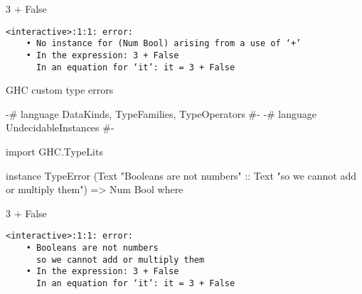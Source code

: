 





\begin{frame}[fragile]

\Large
\begin{texttt}
3 + False
\end{texttt}
\nl

\large
\begin{block}{}
\begin{Verbatim}
<interactive>:1:1: error:
    • No instance for (Num Bool) arising from a use of ‘+’
    • In the expression: 3 + False
      In an equation for ‘it’: it = 3 + False
\end{Verbatim}
\end{block}
\end{frame}


\begin{frame}[fragile]

{\large
GHC custom type errors
}

\nl

\begin{haskellcode}
{-# language DataKinds, TypeFamilies, TypeOperators #-}
{-# language UndecidableInstances #-}

import GHC.TypeLits

instance TypeError (Text "Booleans are not numbers" :$$:
                    Text "so we cannot add or multiply them")
  => Num Bool where
\end{haskellcode}
\end{frame}


\begin{frame}[fragile]

\Large
\begin{texttt}
3 + False
\end{texttt}
\nl

\large
\begin{block}{}
\begin{Verbatim}
<interactive>:1:1: error:
    • Booleans are not numbers
      so we cannot add or multiply them
    • In the expression: 3 + False
      In an equation for ‘it’: it = 3 + False
\end{Verbatim}
\end{block}
\end{frame}


